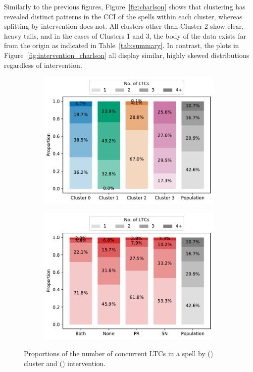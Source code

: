 \documentclass[11pt]{article}
\newlength{\imgwidth}
\begin{document}
Similarly to the previous figures, Figure~\ref{fig:charlson} shows that
clustering has revealed distinct patterns in the CCI of the spells within each
cluster, whereas splitting by intervention does not. All clusters other than
Cluster 2 show clear, heavy tails, and in the cases of Clusters 1 and 3, the
body of the data exists far from the origin as indicated in
Table~\ref{tab:summary}. In contrast, the plots in
Figure~\ref{fig:intervention_charlson} all display similar, highly skewed
distributions regardless of intervention.

\begin{figure}
    \centering
    \begin{subfigure}{.5\imgwidth}
        \includegraphics[width=\linewidth]{img_cluster_ltcs}
        \caption{}\label{fig:cluster_ltcs}
    \end{subfigure}\hfill%
    \begin{subfigure}{.5\imgwidth}
        \includegraphics[width=\linewidth]{img_intervention_ltcs}
        \caption{}\label{fig:intervention_ltcs}
    \end{subfigure}
    \caption{%
        Proportions of the number of concurrent LTCs in a spell by
        () cluster and ()
        intervention.
    }\label{fig:ltcs}
\end{figure}
\end{document}
